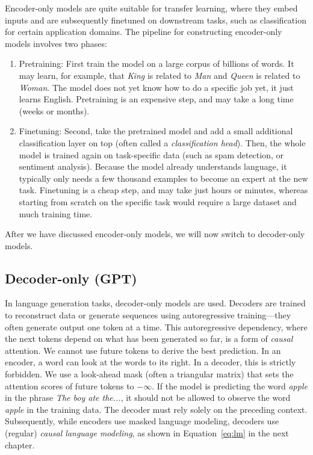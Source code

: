 Encoder-only models are quite suitable  for  transfer learning, where they  embed inputs and are subsequently finetuned on downstream tasks, such as classification for certain application domains. 
The pipeline for constructing encoder-only models involves two phases: 
\begin{enumerate}
    \item Pretraining:  First train the model on a large corpus of billions of words. It may learn, for example,  that \textit{King} is related to \textit{Man} and \textit{Queen} is related to \textit{Woman}. The model does not yet know how to do a specific job yet, it just learns English. Pretraining is an expensive step, and may take a long time (weeks or months).
    \item Finetuning: Second,  take the pretrained model and add a small additional classification layer on top (often called a \textit{classification head}). Then,  the whole model is trained again on task-specific data (such as spam detection, or sentiment analysis). Because the model already understands language, it typically only needs a few thousand examples to become an expert at the new task. Finetuning is a cheap step, and may take just  hours or minutes, whereas  starting from scratch on the specific task would require a large dataset and much training time. 
\end{enumerate}
After we have discussed encoder-only models, we will now switch to decoder-only models.

\subsection{Decoder-only (GPT)}
In language generation tasks, decoder-only models are used. 
Decoders are trained to reconstruct data or generate sequences using  autoregressive training---they often generate output one token at a time. This autoregressive dependency, where the next tokens depend on what has been  generated so far, is a form of \textit{causal} attention. We cannot use future tokens to derive the best prediction.
In an encoder, a word can look at the words to its right. In a decoder, this is strictly forbidden. We use a look-ahead mask (often a triangular matrix) that sets the attention scores of future tokens to $-\infty$. If the model is predicting the word \textit{apple} in the phrase \textit{The boy ate the...}, it should not be allowed to observe the word \textit{apple} in the training data. The decoder must rely solely on the preceding context. Subsequently, while encoders use masked language modeling, decoders use (regular) \textit{causal language modeling}, as shown in Equation~\ref{eq:lm} in the next chapter.



